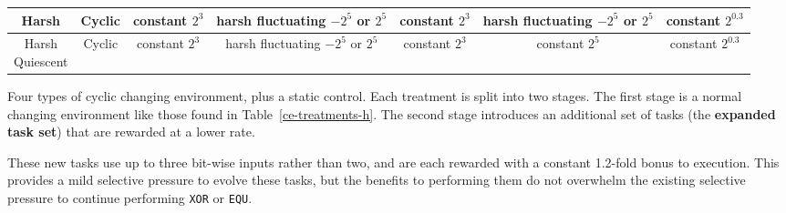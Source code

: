 \documentclass[10pt,letterpaper,final]{article}
\begin{document}
\begin{table}[]
\begin{tabular}{|c|c||c|c||c|c|c|}
	Harsh & Cyclic & \makecell{constant \\ $2^3$} & \makecell{harsh \\ fluctuating \\ $-2^5$ or $2^5$} & \makecell{constant \\ $2^3$} & \makecell{harsh \\ fluctuating \\ $-2^5$ or $2^5$} & \makecell{constant \\ $2^{0.3}$} \\\hline
	\makecell{Harsh \\ Quiescent} & Cyclic & \makecell{constant \\ $2^3$} & \makecell{harsh \\ fluctuating \\ $-2^5$ or $2^5$} & \makecell{constant \\ $2^3$} & \makecell{constant \\ $2^5$} & \makecell{constant \\ $2^{0.3}$} \\\hline
	\end{tabular} 

	\begin{flushleft} Four types of cyclic changing environment, plus a static control. Each treatment is split into two stages. The first stage is a normal changing environment like those found in Table~\ref{ce-treatments-h}. The second stage introduces an additional set of tasks (the \textbf{expanded task set}) that are rewarded at a lower rate.
	\end{flushleft}
	\label{cel-treatments-simple}
	\end{table}

These new tasks use up to three bit-wise inputs rather than two, and are each rewarded with a constant 1.2-fold bonus to execution. This provides a mild selective pressure to evolve these tasks, but the benefits to performing them do not overwhelm the existing selective pressure to continue performing \texttt{XOR} or \texttt{EQU}.
\end{document}
